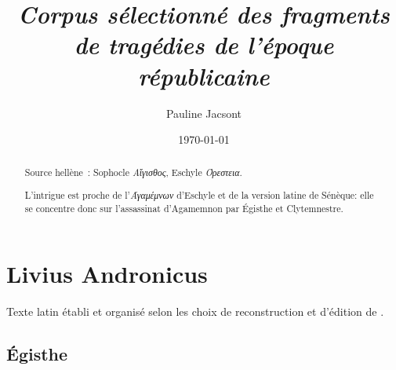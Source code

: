 \documentclass[12pt,onecolumn,twoside,a4paper]{memoir}
\title{\textit{Corpus sélectionné des fragments de tragédies de l'époque républicaine}}
\author{
               Pauline
               Jacsont
            }
\date{\today}
\begin{document}
            
         
            \section{Livius Andronicus}
            Texte latin établi et organisé selon les choix de reconstruction et d'édition de \cite{TrRF_I_2012}.\par
            
               \subsection*{Égisthe}
               \begin{abstract}Source hellène : Sophocle \textit{Αἴγισθος}, Eschyle \textit{Όρεστεια}.\par
                L'intrigue est proche de l'\textit{Άγαμέμνων} d'Eschyle et
                  de la version latine de Sénèque: elle se concentre donc sur l'assassinat
                  d'Agamemnon par Égisthe et Clytemnestre.\par\end{abstract}
\end{document}
